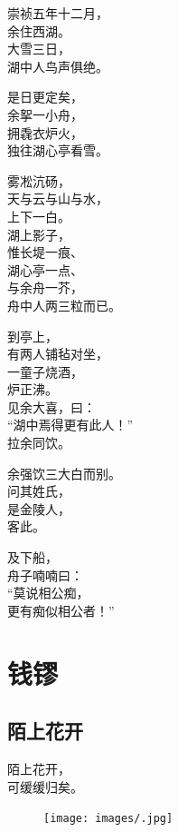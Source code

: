 \documentclass[]{book}
\renewenvironment{quote}{\begin{VF}}{\end{VF}}
\begin{document}
\begin{quote}
崇祯五年十二月，\\
余住西湖。\\
大雪三日，\\
湖中人鸟声俱绝。

是日更定矣，\\
余挐一小舟，\\
拥毳衣炉火，\\
独往湖心亭看雪。

雾凇沆砀，\\
天与云与山与水，\\
上下一白。\\
湖上影子，\\
惟长堤一痕、\\
湖心亭一点、\\
与余舟一芥，\\
舟中人两三粒而已。

到亭上，\\
有两人铺毡对坐，\\
一童子烧酒，\\
炉正沸。\\
见余大喜，曰：\\
``湖中焉得更有此人！''\\
拉余同饮。

余强饮三大白而别。\\
问其姓氏，\\
是金陵人，\\
客此。

及下船，\\
舟子喃喃曰：\\
``莫说相公痴，\\
更有痴似相公者！''
\end{quote}

\chapter{钱镠}

\section{陌上花开}

\begin{quote}
陌上花开，\\
可缓缓归矣。
\end{quote}

\begin{figure}[htbp]
\centering
\texttt{[image: images/.jpg]}
\caption{}
\end{figure}
\end{document}
